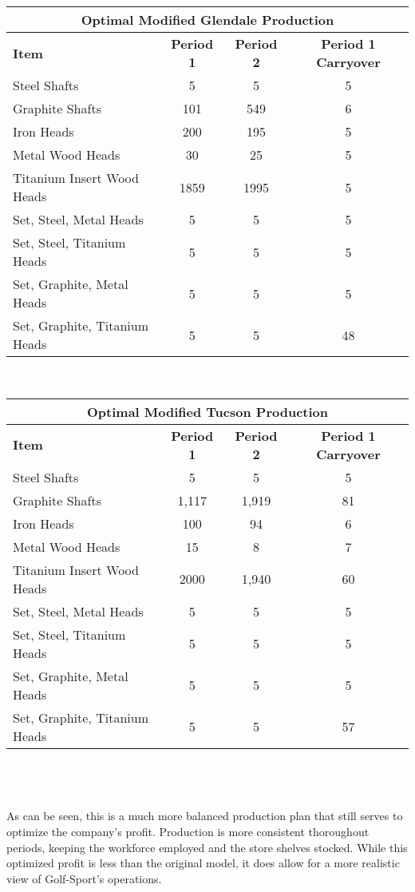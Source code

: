 \documentclass{article}
\begin{document}
\begin{tabular}{ l c c c }
\hline
\multicolumn{4}{|c|}{Optimal Modified Glendale Production} \\
\hline
\textbf{Item} & \textbf{Period 1} & \textbf{Period 2} & \textbf{Period 1 Carryover} \\
Steel Shafts & 5 & 5 & 5 \\
Graphite Shafts & 101 & 549 & 6 \\
Iron Heads & 200 & 195 & 5 \\
Metal Wood Heads & 30 & 25 & 5 \\
Titanium Insert Wood Heads & 1859 & 1995 & 5 \\
Set, Steel, Metal Heads & 5 & 5 & 5 \\
Set, Steel, Titanium Heads & 5 & 5 & 5 \\
Set, Graphite, Metal Heads & 5 & 5 & 5 \\
Set, Graphite, Titanium Heads & 5 & 5 & 48\\
\end{tabular}
\vspace{5mm}
\\
\noindent
\begin{tabular}{ l c c c }
\hline
\multicolumn{4}{|c|}{Optimal Modified Tucson Production} \\
\hline
\textbf{Item} & \textbf{Period 1} & \textbf{Period 2} & \textbf{Period 1 Carryover} \\
Steel Shafts & 5 & 5 & 5 \\
Graphite Shafts & 1,117 & 1,919 & 81 \\
Iron Heads & 100 & 94 & 6 \\
Metal Wood Heads & 15 & 8 & 7 \\
Titanium Insert Wood Heads & 2000 & 1,940 & 60 \\
Set, Steel, Metal Heads & 5 & 5 & 5 \\
Set, Steel, Titanium Heads & 5 & 5 & 5 \\
Set, Graphite, Metal Heads & 5 & 5 & 5 \\
Set, Graphite, Titanium Heads & 5 & 5 & 57\\
\end{tabular}
\\
\\
\vspace{5mm}
\\
As can be seen, this is a much more balanced production plan that still serves to optimize the company's profit.  Production is more consistent thoroughout periods, keeping the workforce employed and the store shelves stocked.  While this optimized profit is less than the original model, it does allow for a more realistic view of Golf-Sport's operations.
\end{document}
